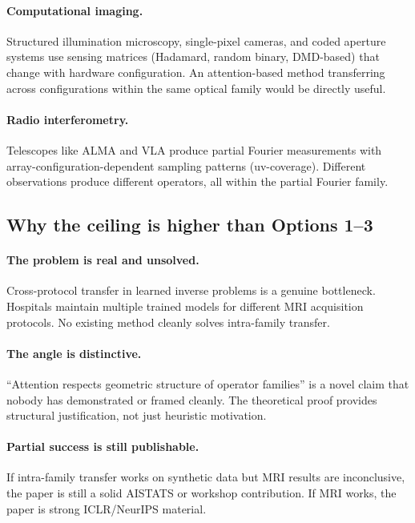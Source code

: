 \documentclass[11pt]{article}
\begin{document}
\paragraph{Computational imaging.}
Structured illumination microscopy, single-pixel cameras, and
coded aperture systems use sensing matrices (Hadamard, random
binary, DMD-based) that change with hardware configuration.
An attention-based method transferring across configurations
within the same optical family would be directly useful.

\paragraph{Radio interferometry.}
Telescopes like ALMA and VLA produce partial Fourier
measurements with array-configuration-dependent sampling
patterns (uv-coverage). Different observations produce
different operators, all within the partial Fourier family.

\subsection{Why the ceiling is higher than Options 1--3}

\paragraph{The problem is real and unsolved.}
Cross-protocol transfer in learned inverse problems is a
genuine bottleneck. Hospitals maintain multiple trained models
for different MRI acquisition protocols.
No existing method cleanly solves intra-family transfer.

\paragraph{The angle is distinctive.}
``Attention respects geometric structure of operator families''
is a novel claim that nobody has demonstrated or framed cleanly.
The theoretical proof provides structural justification,
not just heuristic motivation.

\paragraph{Partial success is still publishable.}
If intra-family transfer works on synthetic data but MRI
results are inconclusive, the paper is still a solid AISTATS
or workshop contribution.
If MRI works, the paper is strong ICLR/NeurIPS material.
\end{document}
